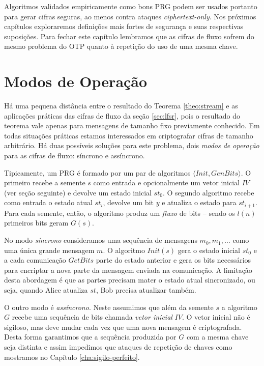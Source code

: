 Algoritmos validados empiricamente como bons PRG podem ser usados portanto para gerar cifras seguras, ao menos contra ataques {\em ciphertext-only}.
Nos próximos capítulos exploraremos definições mais fortes de segurança e suas respectivas suposições.
Para fechar este capítulo lembramos que as cifras de fluxo sofrem do mesmo problema do OTP quanto à repetição do uso de uma mesma chave.

\section{Modos de Operação}
\label{sec:modos-de-operacao}

Há uma pequena distância entre o resultado do Teorema \ref{theo:stream} e as aplicações práticas das cifras de fluxo da seção \ref{sec:lfsr}, pois o resultado do teorema vale apenas para mensagens de tamanho fixo previamente conhecido.
Em todas situações práticas estamos interessados em criptografar cifras de tamanho arbitrário.
Há duas possíveis soluções para este problema, dois {\em modos de operação} para as cifras de fluxo: síncrono e assíncrono.

Tipicamente, um PRG é formado por um par de algoritmos $\langle Init, GenBits \rangle$.
O primeiro recebe a semente $s$ como entrada e opcionalmente um vetor inicial $IV$ (ver seção seguinte) e devolve um estado inicial $st_0$.
O segundo algoritmo recebe como entrada o estado atual $st_i$, devolve um bit $y$ e atualiza o estado para $st_{i+1}$.
Para cada semente, então, o algoritmo produz um {\em fluxo} de bits -- sendo os $l(n)$ primeiros bits geram $G(s)$.

No modo {\em síncrono} consideramos uma sequência de mensagens $m_0, m_1, \dots$ como uma única grande mensagem $m$.
O algoritmo $Init(s)$ gera o estado inicial $st_0$ e a cada comunicação $GetBits$ parte do estado anterior e gera os bits necessários para encriptar a nova parte da mensagem enviada na comunicação.
A limitação desta abordagem é que as partes precisam mater o estado atual sincronizado, ou seja, quando Alice atualiza $st$, Bob precisa atualizar também.

O outro modo é {\em assíncrono}.
Neste assumimos que além da semente $s$ a algoritmo $G$ recebe uma sequência de bits chamada {\em vetor inicial} $IV$.
O vetor inicial não é sigiloso, mas deve mudar cada vez que uma nova mensagem é criptografada.
Desta forma garantimos que a sequência produzida por $G$ com a mesma chave seja distinta e assim impedimos que ataques de repetição de chaves como mostramos no Capítulo \ref{cha:sigilo-perfeito}.

